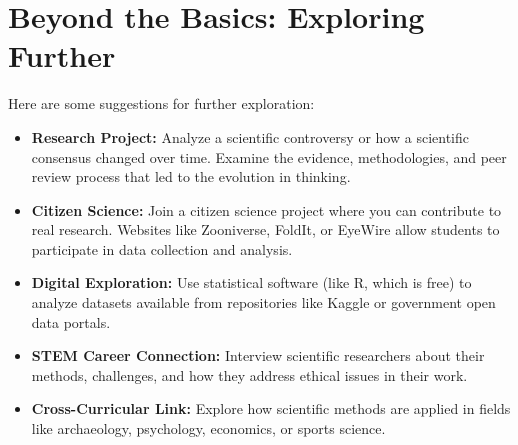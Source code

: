 \documentclass[justified,notoc]{tufte-book}
\begin{document}
\section{Beyond the Basics: Exploring Further}

 Here are some suggestions for further exploration:

\begin{itemize}
    \item \textbf{Research Project:} Analyze a scientific controversy or how a scientific consensus changed over time. Examine the evidence, methodologies, and peer review process that led to the evolution in thinking.
    
    \item \textbf{Citizen Science:} Join a citizen science project where you can contribute to real research. Websites like Zooniverse, FoldIt, or EyeWire allow students to participate in data collection and analysis.
    
    \item \textbf{Digital Exploration:} Use statistical software (like R, which is free) to analyze datasets available from repositories like Kaggle or government open data portals.
    
    \item \textbf{STEM Career Connection:} Interview scientific researchers about their methods, challenges, and how they address ethical issues in their work.
    
    \item \textbf{Cross-Curricular Link:} Explore how scientific methods are applied in fields like archaeology, psychology, economics, or sports science.
\end{itemize}
\end{document}

